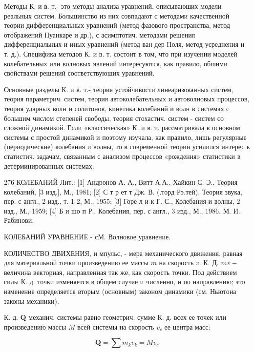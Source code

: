 \documentclass[10pt]{article}
\begin{document}
Методы К. и в. т.- это методы анализа уравнений, описываюших модели реальных систем. Большинство из них совпадают с методами качественной теории дифференциальных уравнений (метод фазового пространства, метод отображений Пуанкаре и др.), с асимптотич. методами решения дифференциальных и иных уравнений (метод ван дер Поля, метод усреднения и т. д.). Специфика методов К. и в. т. состоит в том, что при изучении моделей колебательных или волновых явлений интересуются, как правило, обшими свойствами решений соответствуюших уравнений.



Основные разделы К. и в. т.- теория устойчивости линеаризованных систем, теория параметрич. систем, теория автоколебательных и автоволновых процессов, теория ударных волн и солитонов, кинетика колебаний и волн в системах с большим числом степеней свободы, теория стохастич. систем - систем со сложной динамикой. Если «классическая» К. и в. т. рассматривала в основном системы с простой динамикой и поэтому изучала, как правило, лишь регулярные (периодические) колебания и волны, то в современной теории усилился интерес к статистич. задачам, связанным с анализом процессов «рождения» статистики в детерминированных системах.



276 КОЛЕБАНИЙ Лит.: [1] Андронов А. А., Витт А.А., Хайкин С. Э.. Теория колебаний, [3 изд.], М., 1981; [2] С т р ет т Дж. В. (.торд Рэ.тей), Теория звука, пер. с англ., 2 изд., т. 1-2, М., 1955; [3] Горе л и к Г. С., Колебания и волны, 2 изд., М., 1959; [4] Б и шо п Р.. Колебания, пер. с англ., 3 изд., М., 1986. М. И. Рабинови.



КОЛЕБАНИЙ УРАВНЕНИЕ - сМ. Волновое уравнение.



КОЛИЧЕСТВО ДВИХЕНИЯ, и мпульс, - мера механического движения, равная для материальной точки произведению ее массы $m$ на скорость $v$. К. Д. $m v-$ величина векторная, направленная так же, как скорость точки. Под действием силы К. д. точки изменяется в общем случае и численно, и по направлению; это изменение определяется вторым (основным) законом динамики (см. Ньютона законы механики).



К. д. $\boldsymbol{Q}$ механич. системы равно геометрич. сумме К. д. всех ее точек или произведению массы $M$ всей системы на скорость $v_{c}$ ее центра масс:



\[

\boldsymbol{Q}=\sum m_{k} v_{k}=M v_{c}

\]
\end{document}
